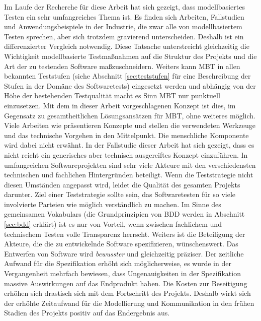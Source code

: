 Im Laufe der Recherche für diese Arbeit hat sich gezeigt, dass modellbasiertes Testen ein sehr umfangreiches Thema ist. Es finden sich Arbeiten, Fallstudien und Anwendungsbeispiele in der Industrie, die zwar alle von modellbasiertem Testen sprechen, aber sich trotzdem gravierend unterscheiden. Deshalb ist ein differenzierter Vergleich notwendig. Diese Tatsache unterstreicht gleichzeitig die Wichtigkeit modellbasierte Testmaßnahmen auf die Struktur des Projekts und die Art der zu testenden Software maßzuschneidern. Weiters kann \Gls{MBT} in allen bekannten Teststufen (siehe Abschnitt \ref{sec:teststufen} für eine Beschreibung der Stufen in der Domäne des Softwaretests) eingesetzt werden und abhängig von der Höhe der bestehenden Testqualität macht es Sinn \Gls{MBT} nur punktuell einzusetzen. Mit dem in dieser Arbeit vorgeschlagenen Konzept ist dies, im Gegensatz zu gesamtheitlichen Lösungsansätzen für \Gls{MBT}, ohne weiteres möglich.\\
Viele Arbeiten wie \cite{pretschner_one_2005} \cite{pinheiro_model-based_2013} \cite{sensler_testautomatisierung_2011} präsentieren Konzepte und stellen die verwendeten Werkzeuge und das technische Vorgehen in den Mittelpunkt. Die menschliche Komponente wird dabei nicht erwähnt. In der Fallstudie dieser Arbeit hat sich gezeigt, dass es nicht reicht ein generisches aber technisch ausgereiftes Konzept einzuführen. In umfangreichen Softwareprojekten sind sehr viele Akteure mit den verschiedensten technischen und fachlichen Hintergründen beteiligt. Wenn die Teststrategie nicht diesen Umständen angepasst wird, leidet die Qualität des gesamten Projekts darunter. Ziel einer Teststrategie sollte sein, das Softwaretesten für so viele involvierte Parteien wie möglich verständlich zu machen. Im Sinne des gemeinsamen Vokabulars (die Grundprinzipien von \Gls{BDD} werden in Abschnitt \ref{sec:bdd} erklärt) ist es nur von Vorteil, wenn zwischen fachlichem und technischem Testen volle Transparenz herrscht. Weiters ist die Beteiligung der Akteure, die die zu entwickelnde Software spezifizieren, wünschenswert. Das Entwerfen von Software wird \textit{bewusster} und gleichzeitig präziser. Der zeitliche Aufwand für die Spezifikation erhöht sich möglicherweise, es wurde in der Vergangenheit mehrfach bewiesen, dass Ungenauigkeiten in der Spezifikation massive Auswirkungen auf das Endprodukt haben. Die Kosten zur Beseitigung erhöhen sich drastisch sich mit dem Fortschritt des Projekts. Deshalb wirkt sich der erhöhte Zeitaufwand für die Modellierung und Kommunikation in den frühen Stadien des Projekts positiv auf das Endergebnis aus.\\
